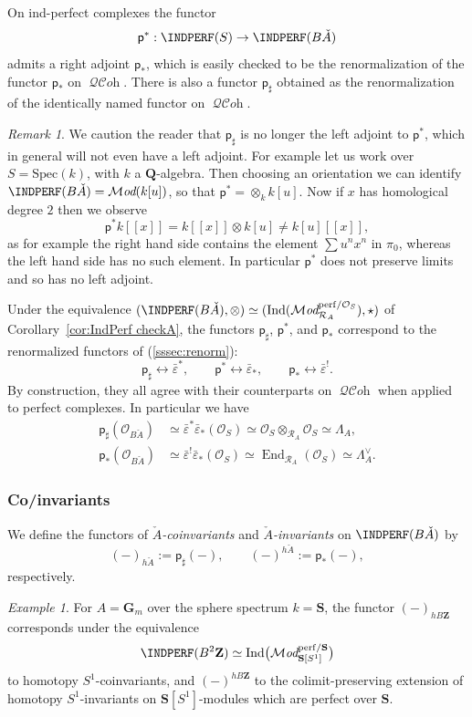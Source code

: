 \documentclass[12pt, oneside]{amsart}
\numberwithin{equation}{section}
\theoremstyle{remark}
\newtheorem{remark}[subsubsection]{Remark}
\newtheorem{example}[subsubsection]{Example}
\theoremstyle{plain}
\newcommand{\MOD}{\mathcal{M}\textit{od}}
\DeclareMathOperator{\QCOH}{\mathcal{QC}\textit{oh}}
\newcommand{\R}{\mathcal{R}}
\newcommand{\RA}{\R_A}
\newcommand{\lam}{\Lambda}
\newcommand{\lamco}{\Lambda^\vee}
\newcommand{\OO}{\mathcal{O}}
\newcommand{\GGm}{\mathbf{G}_{m}}
\newcommand{\bZ}{\mathbf{Z}}
\newcommand{\Ind}{\operatorname{Ind}}
\newcommand{\epsb}{\bar{\varepsilon}}
\newcommand{\sfp}{\mathsf{p}}
\begin{document}
On ind-perfect complexes the functor
$$\sfp^* : \INDPERF(S) \to \INDPERF(B\check{A})$$
admits a right adjoint $\sfp_*$, which is easily checked to be the renormalization of the functor $\sfp_*$ on $\QCOH$. There is also a functor $\sfp_\sharp$ obtained as the renormalization of the identically named functor on $\QCOH$. \begin{remark} We caution the reader that $\sfp_\sharp$ is no longer the left adjoint to $\sfp^*$, which in general will not even have a left adjoint. For example let us work over $S=\text{Spec}(k)$, with $k$ a $\mathbf{Q}$-algebra. Then choosing an orientation we can identify $\INDPERF(B\check{A})=\MOD(k[u])$, so that $\sfp^*=\otimes_k k[u].$ Now if $x$ has homological degree $2$ then we observe $$\sfp^*k[[x]]=k[[x]]\otimes k[u]\neq k[u][[x]],$$ as for example the right hand side contains the element $\sum u^n x^n$ in $\pi_0$, whereas the left hand side has no such element. In particular $\sfp^*$ does not preserve limits and so has no left adjoint.  \end{remark}
Under the equivalence $(\INDPERF(B\check{A}), \otimes) \simeq (\Ind(\MOD_{\RA}^{\mathrm{perf}/\OO_S}), \star)$ of Corollary~\ref{cor:IndPerf checkA}, the functors $\sfp_\sharp$, $\sfp^*$, and $\sfp_*$ correspond to the renormalized functors of (\ref{sssec:renorm}):
\[
  \sfp_\sharp \leftrightarrow \epsb^*, \qquad
  \sfp^* \leftrightarrow \epsb_*, \qquad
  \sfp_* \leftrightarrow \epsb^!.
\]
By construction, they all agree with their counterparts on $\QCOH$ when applied to perfect complexes.
In particular we have
\begin{align*}
  \sfp_\sharp(\OO_{B\check{A}}) &\simeq \epsb^*\epsb_*(\OO_S) \simeq \OO_S \otimes_{\RA} \OO_S \simeq \lam_A,\\
  \sfp_*(\OO_{B\check{A}}) &\simeq \epsb^!\epsb_*(\OO_S) \simeq \operatorname{End}_{\RA}(\OO_S) \simeq \lamco_A.
\end{align*}

\subsubsection{Co/invariants}

We define the functors of \emph{$\check{A}$-coinvariants} and \emph{$\check{A}$-invariants} on $\INDPERF(B\check{A})$ by
\[
  (-)_{h\check{A}} := \sfp_\sharp(-),
  \qquad (-)^{h\check{A}} := \sfp_*(-),
\]
respectively.

\begin{example}
	For $A=\GGm$ over the sphere spectrum $k=\mathbf{S}$, the functor $(-)_{hB\bZ}$ corresponds under the equivalence $$\INDPERF(B^2\bZ) \simeq \Ind\bigl(\MOD_{\mathbf{S}[S^1]}^{\mathrm{perf}/\mathbf{S}}\bigr)$$ to homotopy $S^1$-coinvariants, and $(-)^{hB\bZ}$ to the colimit-preserving extension of homotopy $S^1$-invariants on $\mathbf{S}[S^1]$-modules which are perfect over $\mathbf{S}$.
\end{example}
\end{document}
